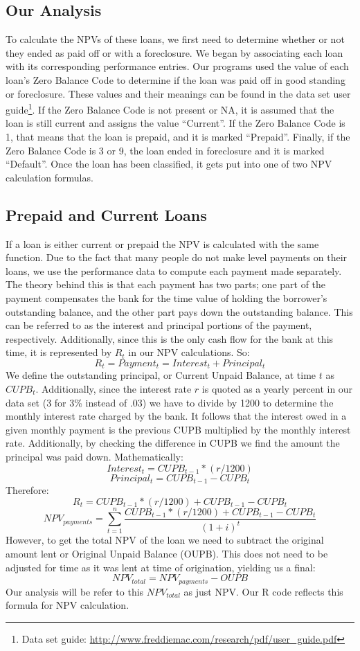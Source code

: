 \documentclass[12 pt]{uncw_thesis}
\theoremstyle{plain}
\theoremstyle{remark}
\theoremstyle{definition}
\begin{document}
\subsection{Our Analysis}
To calculate the NPVs of these loans, we first need to determine whether or not they ended as paid off or with a foreclosure. We began by associating each loan with its corresponding performance entries. Our programs used the value of each loan's Zero Balance Code to determine if the loan was paid off in good standing or foreclosure. These values and their meanings can be found in the data set user guide\footnote{Data set guide: \href{http://www.freddiemac.com/research/pdf/user\_guide.pdf}{http://www.freddiemac.com/research/pdf/user\_guide.pdf}}. If the Zero Balance Code is not present or NA, it is assumed that the loan is still current and assigns the value ``Current''. If the Zero Balance Code is 1, that means that the loan is prepaid, and it is marked ``Prepaid''. Finally, if the Zero Balance Code is 3 or 9, the loan ended in foreclosure and it is marked ``Default''. Once the loan has been classified, it gets put into one of two NPV calculation formulas.
\subsection{Prepaid and Current Loans}
If a loan is either current or prepaid the NPV is calculated with the same function. Due to the fact that many people do not make level payments on their loans, we use the performance data to compute each payment made separately. The theory behind this is that each payment has two parts; one part of the payment compensates the bank for the time value of holding the borrower's outstanding balance, and the other part pays down the outstanding balance. This can be referred to as the interest and principal portions of the payment, respectively. Additionally, since this is the only cash flow for the bank at this time, it is represented by \(R_t\) in our NPV calculations.  So:
\[R_t = Payment_t = Interest_t + Principal_t\]
We define the outstanding principal, or Current Unpaid Balance, at time \(t\) as \(CUPB_t\). Additionally, since the interest rate \(r\) is quoted as a yearly percent in our data set (3 for 3\% instead of .03) we have to divide by 1200 to determine the monthly interest rate charged by the bank. It follows that the interest owed in a given monthly payment is the previous CUPB multiplied by the monthly interest rate. Additionally, by checking the difference in CUPB we find the amount the principal was paid down. Mathematically:
\[Interest_t = CUPB_{t-1}*(r/1200)\]
\[Principal_t = CUPB_{t-1} - CUPB_{t}\]
Therefore: 
\[R_t = CUPB_{t-1}*(r/1200) + CUPB_{t-1} - CUPB_{t}\]
\[NPV_{payments} = \sum_{t=1}^n \frac{CUPB_{t-1}*(r/1200) + CUPB_{t-1} - CUPB_{t}}{(1+i)^t}\]
However, to get the total NPV of the loan we need to subtract the original amount lent or Original Unpaid Balance (OUPB). This does not need to be adjusted for time as it was lent at time of origination, yielding us a final:
\[NPV_{total} = NPV_{payments} - OUPB\]
Our analysis will be refer to this \(NPV_{total}\) as just NPV. Our R code reflects this formula for NPV calculation.
\end{document}
